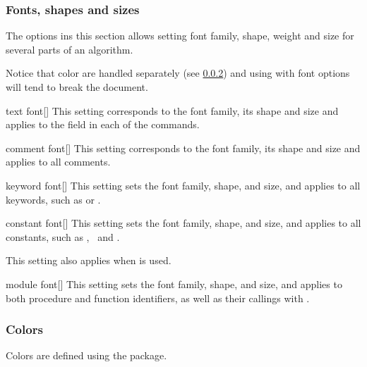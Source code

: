 \documentclass[a4paper, 11pt]{article}
\begin{document}
\subsubsection{Fonts, shapes and sizes}
The options ins this section allows setting font family, shape, weight and size for several parts of an algorithm.

Notice that color are handled separately (see \cref{sec:colors}) and using  with font options will tend to break the document.

\begin{option}{text font}{}[\Empty]
    This setting corresponds to the font family, its shape and size and applies to the  field in each of the commands.
\end{option}

\begin{option}{comment font}{}[]
    This setting corresponds to the font family, its shape and size and applies to all comments.
\end{option}

\begin{option}{keyword font}{}[]
    This setting sets the font family, shape, and size, and applies to all keywords, such as  or .
\end{option}

\begin{option}{constant font}{}[]
    This setting sets the font family, shape, and size, and applies to all constants, such as \Nil, \True\ and \False.

    This setting also applies when  is used.
\end{option}

\begin{option}{module font}{}[]
    This setting sets the font family, shape, and size, and applies to both procedure and function identifiers, as well as their callings with .
\end{option}

\subsubsection{Colors}\label{sec:colors}
Colors are defined using the  package.
\end{document}

